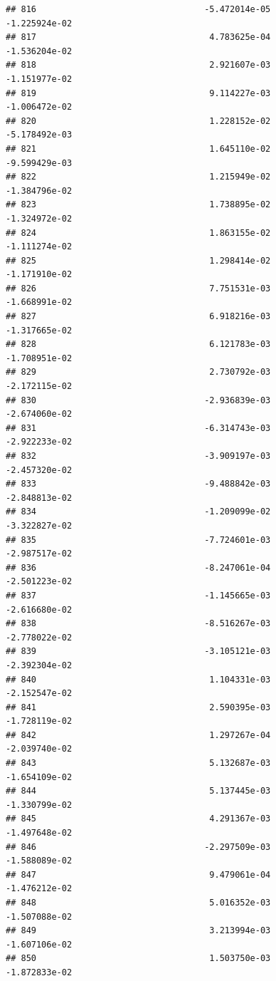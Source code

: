 \documentclass[
]{article}
\begin{document}
\begin{verbatim}
## 816                                 -5.472014e-05          -1.225924e-02
## 817                                  4.783625e-04          -1.536204e-02
## 818                                  2.921607e-03          -1.151977e-02
## 819                                  9.114227e-03          -1.006472e-02
## 820                                  1.228152e-02          -5.178492e-03
## 821                                  1.645110e-02          -9.599429e-03
## 822                                  1.215949e-02          -1.384796e-02
## 823                                  1.738895e-02          -1.324972e-02
## 824                                  1.863155e-02          -1.111274e-02
## 825                                  1.298414e-02          -1.171910e-02
## 826                                  7.751531e-03          -1.668991e-02
## 827                                  6.918216e-03          -1.317665e-02
## 828                                  6.121783e-03          -1.708951e-02
## 829                                  2.730792e-03          -2.172115e-02
## 830                                 -2.936839e-03          -2.674060e-02
## 831                                 -6.314743e-03          -2.922233e-02
## 832                                 -3.909197e-03          -2.457320e-02
## 833                                 -9.488842e-03          -2.848813e-02
## 834                                 -1.209099e-02          -3.322827e-02
## 835                                 -7.724601e-03          -2.987517e-02
## 836                                 -8.247061e-04          -2.501223e-02
## 837                                 -1.145665e-03          -2.616680e-02
## 838                                 -8.516267e-03          -2.778022e-02
## 839                                 -3.105121e-03          -2.392304e-02
## 840                                  1.104331e-03          -2.152547e-02
## 841                                  2.590395e-03          -1.728119e-02
## 842                                  1.297267e-04          -2.039740e-02
## 843                                  5.132687e-03          -1.654109e-02
## 844                                  5.137445e-03          -1.330799e-02
## 845                                  4.291367e-03          -1.497648e-02
## 846                                 -2.297509e-03          -1.588089e-02
## 847                                  9.479061e-04          -1.476212e-02
## 848                                  5.016352e-03          -1.507088e-02
## 849                                  3.213994e-03          -1.607106e-02
## 850                                  1.503750e-03          -1.872833e-02

\end{verbatim}
\end{document}
